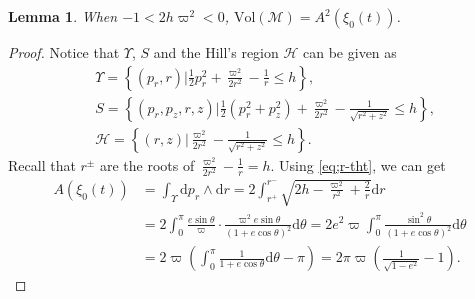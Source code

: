 \documentclass[11pt]{amsart}
\newcommand{\om}{\varpi}
\newtheorem{lemma}{Lemma}[section]
\begin{document}
\begin{lemma}\label{lemma:kepler equal}
	 When $-1<2h\om^2<0$, $\text{Vol}(\mathcal{M})=A^{2}(\xi_0(t))$.
\end{lemma}
\begin{proof}
	Notice that $\Upsilon$, $S$ and the Hill's region $\mathcal{H}$ can be given as
	\begin{equation}
		\begin{aligned}
			&\Upsilon=\left\{(p_{r},r)|\frac{1}{2}p_{r}^{2}+\frac{\om^{2}}{2r^{2}}-\frac{1}{r}\leq h \right\},\\
			&S=\left\{(p_{r},p_{z},r ,z)|\frac{1}{2}(p_{r}^{2}+p_{z}^{2})+\frac{\om^{2}}{2r^{2}}-\frac{1}{\sqrt{r^{2}+z^{2}}}\leq h \right\},\\
			&\mathcal{H}=\left\{(r,z)|\frac{\om^{2}}{2r^{2}}-\frac{1}{\sqrt{r^{2}+z^{2}}}\leq h \right\}.
		\end{aligned}
	\end{equation}
	Recall that $r^{\pm}$ are the roots of $\frac{\om^{2}}{2r^{2}}-\frac{1}{r}=h$. Using \eqref{eq;r-tht}, we can get
	\begin{equation}\label{eq:action of Kepler}
		\begin{aligned}
			A(\xi_{0}(t))&=\int_{\Upsilon}\mathrm{d}p_{r}\wedge\mathrm{d}r=2\int_{r^{+}}^{r^{-}}\sqrt{2h-\frac{\om^{2}}{r^{2}}+\frac{2}{r}}\mathrm{d}r\\
			&=2\int_{0}^{\pi}\frac{e\sin\theta}{\om}\cdot\frac{\om^{2}e\sin\theta}{(1+e\cos\theta)^{2}}\mathrm{d}\theta=2e^{2}\om\int_{0}^{\pi}\frac{\sin^{2}\theta}{(1+e\cos\theta)^{2}}\mathrm{d}\theta\\
			&=2\om\left(\int_{0}^{\pi}\frac{1}{1+e\cos\theta}\mathrm{d}\theta-\pi\right)=2\pi\om\left(\frac{1}{\sqrt{1-e^{2}}}-1\right).
		\end{aligned}
	\end{equation}


\end{proof}
\end{document}
